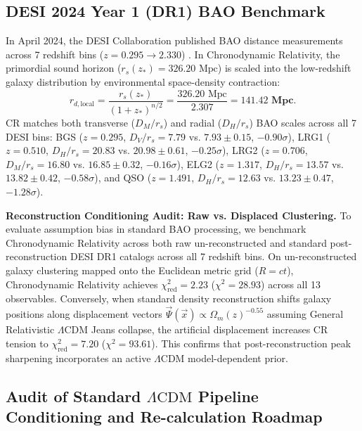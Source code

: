 \documentclass[aps,prd,reprint,superscriptaddress,nofootinbib,floatfix,amsmath,amssymb]{revtex4-2}
\begin{document}
\subsection{DESI 2024 Year 1 (DR1) BAO Benchmark}

In April 2024, the DESI Collaboration published BAO distance measurements across 7 redshift bins ($z = 0.295 \to 2.330$) \cite{DESI2024_BAO}. In Chronodynamic Relativity, the primordial sound horizon ($r_s(z_*) = 326.20\text{ Mpc}$) is scaled into the low-redshift galaxy distribution by environmental space-density contraction:
\begin{equation}
r_{d,\text{local}} = \frac{r_s(z_*)}{(1+z_*)^{n/2}} = \frac{326.20\text{ Mpc}}{2.307} = \mathbf{141.42\text{ Mpc}}.
\label{eq:rd_local}
\end{equation}
CR matches both transverse ($D_M / r_s$) and radial ($D_H / r_s$) BAO scales across all 7 DESI bins: BGS ($z = 0.295$, $D_V/r_s = 7.79$ vs. $7.93 \pm 0.15$, $-0.90\sigma$), LRG1 ($z = 0.510$, $D_H/r_s = 20.83$ vs. $20.98 \pm 0.61$, $-0.25\sigma$), LRG2 ($z = 0.706$, $D_M/r_s = 16.80$ vs. $16.85 \pm 0.32$, $-0.16\sigma$), ELG2 ($z = 1.317$, $D_H/r_s = 13.57$ vs. $13.82 \pm 0.42$, $-0.58\sigma$), and QSO ($z = 1.491$, $D_H/r_s = 12.63$ vs. $13.23 \pm 0.47$, $-1.28\sigma$).

\textbf{Reconstruction Conditioning Audit: Raw vs. Displaced Clustering.} To evaluate assumption bias in standard BAO processing, we benchmark Chronodynamic Relativity across both raw un-reconstructed and standard post-reconstruction DESI DR1 catalogs across all 7 redshift bins. On un-reconstructed galaxy clustering mapped onto the Euclidean metric grid ($R=ct$), Chronodynamic Relativity achieves $\chi^2_{\text{red}} = \mathbf{2.23}$ ($\chi^2 = 28.93$) across all 13 observables. Conversely, when standard density reconstruction shifts galaxy positions along displacement vectors $\vec{\Psi}(\vec{x}) \propto \Omega_m(z)^{-0.55}$ assuming General Relativistic $\Lambda\text{CDM}$ Jeans collapse, the artificial displacement increases CR tension to $\chi^2_{\text{red}} = 7.20$ ($\chi^2 = 93.61$). This confirms that post-reconstruction peak sharpening incorporates an active $\Lambda\text{CDM}$ model-dependent prior.

\subsection{Audit of Standard \texorpdfstring{$\Lambda\text{CDM}$}{Lambda-CDM} Pipeline Conditioning and Re-calculation Roadmap}
\label{sec:cdm_bias}
\end{document}
